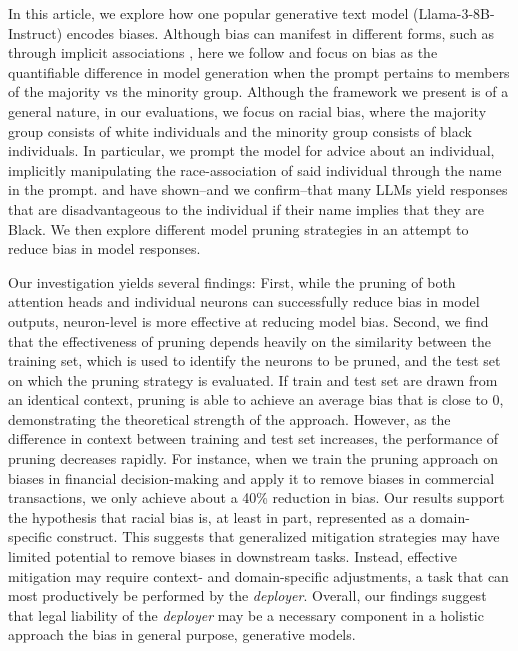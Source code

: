 In this article, we explore how one popular generative text model (Llama-3-8B-Instruct) encodes biases. Although bias can manifest in different forms, such as through implicit associations \cite{kotek2023gender}, here we follow \textcite{haim2024whatsnameauditinglarge, eloundou2024firstpersonfairnesschatbots} and focus on bias as the quantifiable difference in model generation when the prompt pertains to members of the majority vs the minority group. Although the framework we present is of a general nature, in our evaluations, we focus on racial bias, where the majority group consists of white individuals and the minority group consists of black individuals. In particular, we prompt the model for advice about an individual, implicitly manipulating the race-association of said individual through the name in the prompt. \textcite{haim2024whatsnameauditinglarge} and \textcite{bai2024measuringimplicitbiasexplicitly} have shown--and we confirm--that many LLMs yield responses that are disadvantageous to the individual if their name implies that they are Black. We then explore different model pruning strategies in an attempt to reduce bias in model responses.

Our investigation yields several findings: First, while the pruning of both attention heads and individual neurons can successfully reduce bias in model outputs, neuron-level is more effective at reducing model bias. Second, we find that the effectiveness of pruning depends heavily on the similarity between the training set, which is used to identify the neurons to be pruned, and the test set on which the pruning strategy is evaluated. If train and test set are drawn from an identical context, pruning is able to achieve an average bias that is close to 0, demonstrating the theoretical strength of the approach. However, as the difference in context between training and test set increases, the performance of pruning decreases rapidly. For instance, when we train the pruning approach on biases in financial decision-making and apply it to remove biases in commercial transactions, we only achieve about a 40\% reduction in bias. 
Our results support the hypothesis that racial bias is, at least in part, represented as a domain-specific construct. This suggests that generalized mitigation strategies may have limited potential to remove biases in downstream tasks. Instead, effective mitigation may require context- and domain-specific adjustments, a task that can most productively be performed by the \textit{deployer}. Overall, our findings suggest that legal liability of the \textit{deployer} may be a necessary component in a holistic approach the bias in general purpose, generative models.